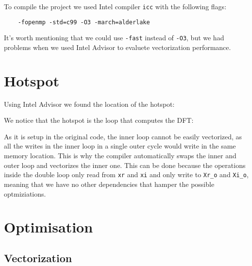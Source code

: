 \documentclass{article}
\begin{document}
To compile the project we used Intel compiler \texttt{icc} with the following flags: 
\begin{verbatim}
    -fopenmp -std=c99 -O3 -march=alderlake
\end{verbatim}
It's worth mentioning that we could use \verb|-fast| instead of \verb|-O3|, but we had problems when we used Intel Advisor to evaluete vectorization performance.

\section{Hotspot}
Using Intel Advisor we found the location of the hotspot:


We notice that the hotspot is the loop that computes the DFT:


As it is setup in the original code, the inner loop cannot be easily vectorized, as all the writes in the inner loop in a single outer cycle would write in the same memory location. This is why the compiler automatically swaps the inner and outer loop and vectorizes the inner one. This can be done because the operations inside the double loop only read from \verb|xr| and \verb|xi| and only write to \verb|Xr_o| and \verb|Xi_o|, meaning that we have no other dependencies that hamper the possible optmiziations.

\section{Optimisation}
\subsection{Vectorization}
\end{document}
